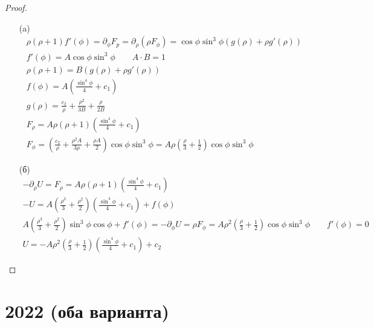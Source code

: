 \begin{proof}
\begin{itemize}
\item[]
\item[(a)]
    \begin{gather*}
        \rho \left(\rho + 1\right) f'(\phi)
        = \partial_{\phi} F_p
        = \partial_{\rho} \left(\rho F_{\phi}\right)
        = \cos \phi \sin^3 \phi \left(g(\rho) + \rho g' (\rho)\right)\\
        f'(\phi) = A \cos \phi \sin^3 \phi\qquad
        A \cdot B = 1\\
        \rho \left(\rho + 1\right) = B\left(g(\rho) + \rho g'(\rho)\right)\\
        f(\phi) = A \left(\frac{\sin^4 \phi}{4} + c_1\right)\\
        g(\rho) = \frac{c_2}{\rho} + \frac{\rho^2}{3B} + \frac{\rho}{2B}\\
        F_{\rho} = A \rho \left(\rho + 1\right) \left(\frac{\sin^4 \phi}{4} + c_1\right)\\
        F_{\phi} = \left(\frac{c_2}{\rho} + \frac{\rho^2 A}{3 \rho} + \frac{\rho A}{2}\right) \cos \phi \sin^3 \phi
        = A \rho \left(\frac{\rho}{3} + \frac{1}{2}\right)\cos \phi \sin^3 \phi
    \end{gather*}
\item[(б)]
    \begin{gather*}
        -\partial_{\rho} U
        = F_{\rho}
        = A \rho \left(\rho + 1\right) \left(\frac{\sin^4 \phi}{4} + c_1\right)\\
        -U = A\left(\frac{\rho^3}{3} + \frac{\rho^2}{2}\right)\left(\frac{\sin^4 \phi}{4} + c_1\right) + f(\phi)\\
        A\left(\frac{\rho^3}{3} + \frac{\rho^2}{2}\right)\sin^3 \phi \cos \phi + f'(\phi)
        = -\partial_{\phi} U
        = \rho F_{\phi}
        = A \rho^2 \left(\frac{\rho}{3} + \frac{1}{2}\right) \cos \phi \sin^3 \phi\qquad
        f'(\phi) = 0\\
        U = -A \rho^2 \left(\frac{\rho}{3} + \frac{1}{2}\right)\left(\frac{\sin^4 \phi}{4} + c_1\right) + c_2
    \end{gather*}
\end{itemize}
\end{proof}
\newpage



\section{2022 (оба варианта)}

